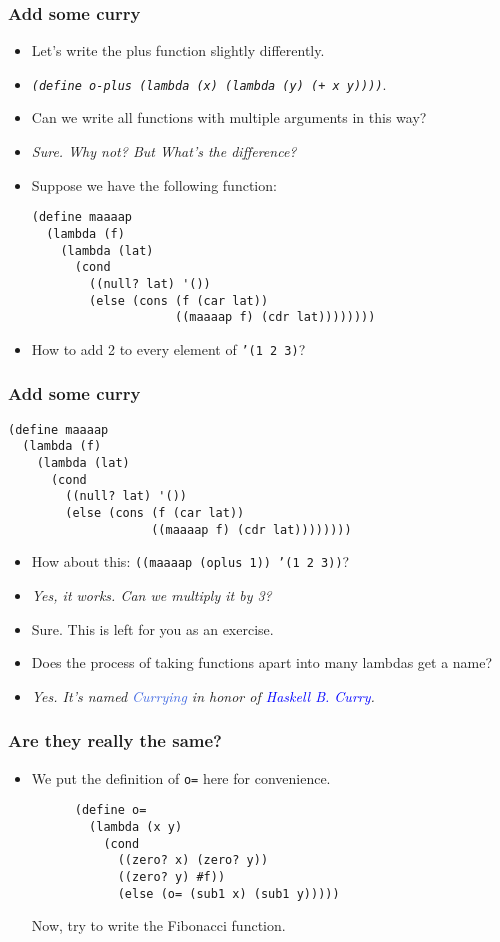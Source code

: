 \begin{frame}[fragile]
  \frametitle{Add some curry}
  \begin{itemize}
    \item Let's write the plus function slightly differently.
    \item \emph{\texttt{(define o-plus (lambda (x) (lambda (y) (+ x y))))}}.
    \item Can we write all functions with multiple arguments in this way?
    \pause
    \item \emph{Sure. Why not? But What's the difference?}
    \item Suppose we have the following function:
    \begin{verbatim}
(define maaaap
  (lambda (f)
    (lambda (lat)
      (cond
        ((null? lat) '())
        (else (cons (f (car lat))
                    ((maaaap f) (cdr lat))))))))
    \end{verbatim}
    \item How to add 2 to every element of \texttt{'(1 2 3)}?
  \end{itemize}
\end{frame}

\begin{frame}[fragile]
  \frametitle{Add some curry}
    \begin{verbatim}
(define maaaap
  (lambda (f)
    (lambda (lat)
      (cond
        ((null? lat) '())
        (else (cons (f (car lat))
                    ((maaaap f) (cdr lat))))))))
    \end{verbatim}
  \begin{itemize}
    \item How about this: \texttt{((maaaap (oplus 1)) '(1 2 3))}?
    \pause
    \item \emph{Yes, it works. Can we multiply it by 3?}
    \item Sure. This is left for you as an exercise.
    \pause
    \item Does the process of taking functions apart into many lambdas get a name?
    \item \emph{Yes. It's named \textcolor{RoyalBlue}{Currying} in honor of \textcolor{Blue}{Haskell B. Curry}.}
  \end{itemize}
\end{frame}

\begin{frame}[fragile]
  \frametitle{Are they really the same?}
  \begin{itemize}
    \item We put the definition of \texttt{o=} here for convenience.
    \begin{verbatim}
      (define o=
        (lambda (x y)
          (cond
            ((zero? x) (zero? y))
            ((zero? y) #f))
            (else (o= (sub1 x) (sub1 y)))))
    \end{verbatim}
    Now, try to write the Fibonacci function.
  \end{itemize}
\end{frame}

